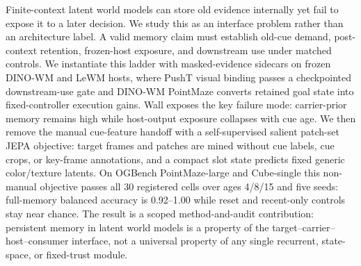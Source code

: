 Finite-context latent world models can store old evidence internally yet fail
to expose it to a later decision.  We study this as an interface problem rather
than an architecture label.  A valid memory claim must establish old-cue
demand, post-context retention, frozen-host exposure, and downstream use under
matched controls.  We instantiate this ladder with masked-evidence sidecars on
frozen DINO-WM and LeWM hosts, where PushT visual binding passes a
checkpointed downstream-use gate and DINO-WM PointMaze converts retained goal
state into fixed-controller execution gains.  Wall exposes the key failure
mode: carrier-prior memory remains high while host-output exposure collapses
with cue age.  We then remove the manual cue-feature handoff with a
self-supervised salient patch-set JEPA objective: target frames and patches
are mined without cue labels, cue crops, or key-frame annotations, and a
compact slot state predicts fixed generic color/texture latents.  On OGBench
PointMaze-large and Cube-single this non-manual objective passes all 30
registered cells over ages 4/8/15 and five seeds: full-memory balanced
accuracy is 0.92--1.00 while reset and recent-only controls stay near chance.
The result is a scoped method-and-audit contribution: persistent memory in
latent world models is a property of the target--carrier--host--consumer
interface, not a universal property of any single recurrent, state-space, or
fixed-trust module.
